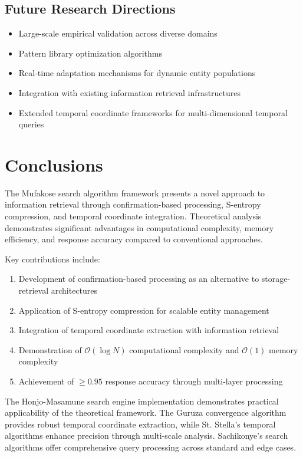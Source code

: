 \documentclass[12pt,a4paper]{article}
\begin{document}
\subsection{Future Research Directions}

\begin{itemize}
\item Large-scale empirical validation across diverse domains
\item Pattern library optimization algorithms
\item Real-time adaptation mechanisms for dynamic entity populations
\item Integration with existing information retrieval infrastructures
\item Extended temporal coordinate frameworks for multi-dimensional temporal queries
\end{itemize}

\section{Conclusions}

The Mufakose search algorithm framework presents a novel approach to information retrieval through confirmation-based processing, S-entropy compression, and temporal coordinate integration. Theoretical analysis demonstrates significant advantages in computational complexity, memory efficiency, and response accuracy compared to conventional approaches.

Key contributions include:

\begin{enumerate}
\item Development of confirmation-based processing as an alternative to storage-retrieval architectures
\item Application of S-entropy compression for scalable entity management
\item Integration of temporal coordinate extraction with information retrieval
\item Demonstration of $\mathcal{O}(\log N)$ computational complexity and $\mathcal{O}(1)$ memory complexity
\item Achievement of $\geq 0.95$ response accuracy through multi-layer processing
\end{enumerate}

The Honjo-Masamune search engine implementation demonstrates practical applicability of the theoretical framework. The Guruza convergence algorithm provides robust temporal coordinate extraction, while St. Stella's temporal algorithms enhance precision through multi-scale analysis. Sachikonye's search algorithms offer comprehensive query processing across standard and edge cases.
\end{document}
